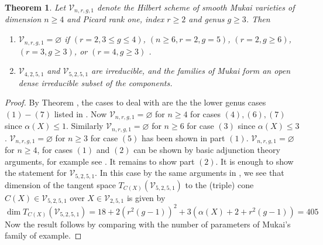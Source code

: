 \documentclass[11pt,twoside]{amsart}
\theoremstyle{plain}
\numberwithin{equation}{section}
\newtheorem{theorem}{Theorem}[section]
\theoremstyle{definition}
\begin{document}
\begin{theorem}\label{classification of Mukai varieties with index two}
Let $\mathcal{V}_{n,r,g,1}$ denote the Hilbert scheme of smooth Mukai varieties of dimension $n \geq 4$ and Picard rank one, index $r \geq 2$ and genus $g \geq 3$. Then 
\begin{enumerate}
    \item $\mathcal{V}_{n,r,g,1} = \varnothing$ if $(r = 2, 3 \leq g \leq 4)$, $(n \geq 6, r = 2, g = 5)$, $(r = 2, g \geq 6)$, $(r = 3, g \geq 3)$, or $(r = 4, g \geq 3)$ . 
    \item $\mathcal{V}_{4,2,5,1}$ and $\mathcal{V}_{5,2,5,1}$ are irreducible, and the families of Mukai form an open dense irreducible subset of the components.
\end{enumerate}
\end{theorem}

\begin{proof}
   By Theorem , the cases to deal with are the the lower genus cases $(1)-(7)$ listed in . Now $\mathcal{V}_{n,r,g,1} = \varnothing$ for $n \geq 4$ for cases $(4), (6), (7)$ since $\alpha(X) \leq 1$. Similarly $\mathcal{V}_{n,r,g,1} = \varnothing$ for $n \geq 6$ for case $(3)$ since $\alpha(X) \leq 3$. $\mathcal{V}_{n,r,g,1} = \varnothing$ for $n \geq 3$ for case $(5)$ has been shown in  part $(1)$. $\mathcal{V}_{n,r,g,1} = \varnothing$ for $n \geq 4$, for cases $(1)$   and $(2)$ can be shown by basic adjunction theory arguments, for example see \cite[Theorem $3.11$]{CLM98}. It remains to show part $(2)$. It is enough to show the statement for $\mathcal{V}_{5,2,5,1}$. In this case by the same arguments in , we see that dimension of the tangent space $T_{C(X)}(\mathcal{V}_{5,2,5,1})$ to the (triple) cone $C(X) \in \mathcal{V}_{5,2,5,1}$ over $X \in \mathcal{V}_{2,5,1}$ is given by 
   $$\operatorname{dim}T_{C(X)}(\mathcal{V}_{5,2,5,1}) = 18+2(r^2(g-1))^2+3(\alpha(X)+2+r^2(g-1)) = 405$$
   Now the result follows by comparing with the number of parameters of Mukai's family of example.


\end{proof}
\end{document}
